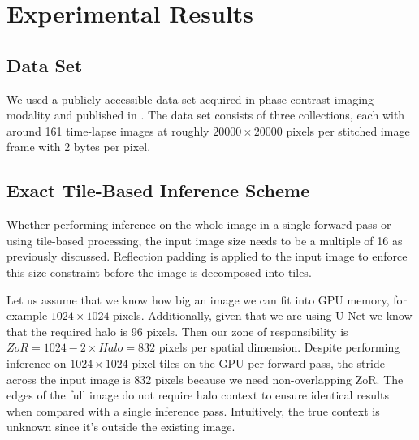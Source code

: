 \documentclass[10pt, indentfirst]{article}
\begin{document}
\section{Experimental Results}
\label{experimental-results}

\subsection{Data Set}
\label{dataset}

We used a publicly accessible data set acquired in phase contrast imaging modality and published in \citep{Bhadriraju2016}. 
The data set consists of three collections, each with around 161 time-lapse images at roughly $\num{20000} \times \num{20000}$  pixels per stitched image frame with 2 bytes per pixel. 


\subsection{Exact Tile-Based Inference Scheme}

Whether performing inference on the whole image in a single forward pass or using tile-based processing, the input image size needs to be a multiple of 16 as previously discussed. Reflection padding is applied to the input image to enforce this size constraint before the image is decomposed into tiles. 

Let us assume that we know how big an image we can fit into GPU memory, for example $1024 \times 1024$ pixels. Additionally, given that we are using U-Net we know that the required halo is 96 pixels. Then our zone of responsibility is $ZoR = 1024 - 2 \times Halo = 832$ pixels per spatial dimension. 
Despite performing inference on $1024 \times 1024$ pixel tiles on the GPU per forward pass, the stride across the input image is 832 pixels because we need non-overlapping ZoR. 
The edges of the full image do not require halo context to ensure identical results when compared with a single inference pass. Intuitively, the true context is unknown since it's outside the existing image.
\end{document}
